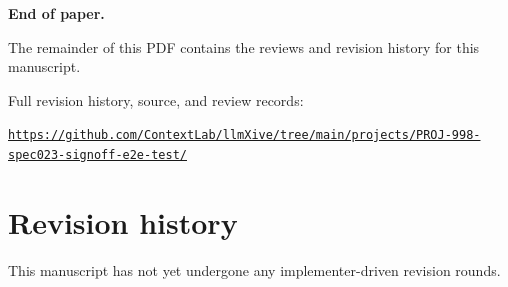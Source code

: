 \clearpage
\thispagestyle{empty}
\vspace*{\fill}
\begin{center}
  {\Large\bfseries End of paper.}\par\vspace{1em}
  The remainder of this PDF contains the reviews and
  revision history for this manuscript.\par\vspace{1em}
  Full revision history, source, and review records:
  \par\vspace{0.5em}
  \texttt{\href{https://github.com/ContextLab/llmXive/tree/main/projects/PROJ-998-spec023-signoff-e2e-test/}{https://github.com/ContextLab/llmXive/tree/main/projects/PROJ-998-spec023-signoff-e2e-test/}}
\end{center}
\vspace*{\fill}
\clearpage



\clearpage

\section*{Revision history}

This manuscript has not yet undergone any implementer-driven revision rounds.